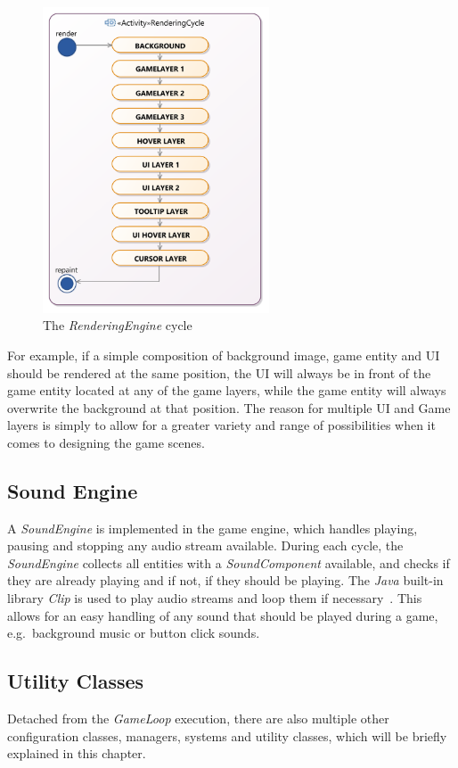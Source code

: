 \begin{figure}
    \centering
    \includegraphics[width=0.6\textwidth]{Pictures/res/implementation/RenderLayers}
    \caption{The \textit{RenderingEngine} cycle}
    \label{fig:render-cycle}
\end{figure}
For example, if a simple composition of background image, game entity and UI should be rendered at the same position,
the UI will always be in front of the game entity located at any of the game layers,
while the game entity will always overwrite the background at that position.
The reason for multiple UI and Game layers is simply to allow for a greater variety and range of possibilities when it comes to designing the game scenes.
\subsection{Sound Engine}\label{subsec:sound-engine}
A \textit{SoundEngine} is implemented in the game engine, which handles playing, pausing and stopping any audio stream available.
During each cycle, the \textit{SoundEngine} collects all entities with a \textit{SoundComponent} available, and checks if they are already playing and if not, if they should be playing.
The \textit{Java} built-in library \textit{Clip} is used to play audio streams and loop them if necessary~\cite{clip}.
This allows for an easy handling of any sound that should be played during a game, e.g.\ background music or button click sounds.

\subsection{Utility Classes}\label{subsec:utility-classes}
Detached from the \textit{GameLoop} execution, there are also multiple other configuration classes, managers, systems and utility classes, which will be briefly explained in this chapter.
